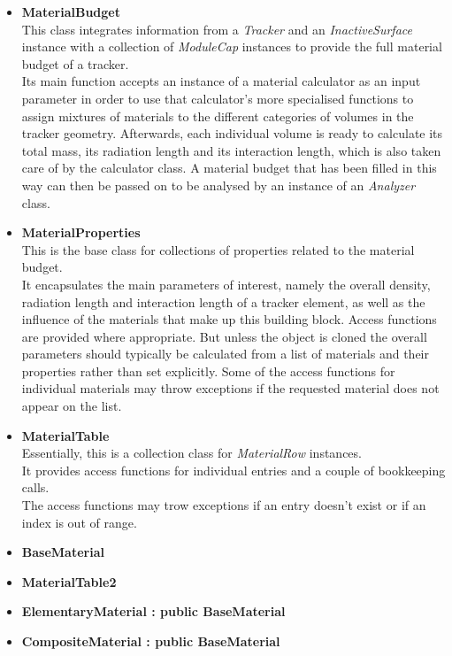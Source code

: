 \documentclass[12pt, a4paper]{article}
\begin{document}
\begin{itemize}

\item \textbf{MaterialBudget}\\
This class integrates information from a \emph{Tracker} and an \emph{InactiveSurface} instance with a collection of \emph{ModuleCap} instances to provide the full material budget of a tracker.\\
Its main function accepts an instance of a material calculator as an input parameter in order to use that calculator's more specialised functions to assign mixtures of materials to the different categories of volumes in the tracker geometry. Afterwards, each individual volume is ready to calculate its total mass, its radiation length and its interaction length, which is also taken care of by the calculator class. A material budget that has been filled in this way can then be passed on to be analysed by an instance of an \emph{Analyzer} class.

\item \textbf{MaterialProperties}\\
This is the base class for collections of properties related to the material budget.\\
It encapsulates the main parameters of interest, namely the overall density, radiation length and interaction length of a tracker element, as well as the influence of the materials that make up this building block. Access functions are provided where appropriate. But unless the object is cloned the overall parameters should typically be calculated from a list of materials and their properties rather than set explicitly. Some of the access functions for individual materials may throw exceptions if the requested material does not appear on the list.

\item \textbf{MaterialTable} \\
Essentially, this is a collection class for \emph{MaterialRow} instances.\\
It provides access functions for individual entries and a couple of bookkeeping calls.\\
The access functions may trow exceptions if an entry doesn't exist or if an index is out of range.

\item \textbf{BaseMaterial}
\item \textbf{MaterialTable2}
\item \textbf{ElementaryMaterial : public BaseMaterial}
\item \textbf{CompositeMaterial : public BaseMaterial}


\end{itemize}
\end{document}

